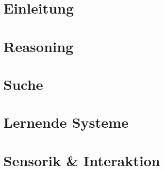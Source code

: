 \documentclass[11pt,oneside]{book} %
\begin{document}




\pagestyle{empty} %

\tableofcontents %


\pagestyle{fancy} %

\part{Einleitung}



\part{Reasoning}




\part{Suche}




\part{Lernende Systeme}




\part{Sensorik \& Interaktion}


\end{document}
